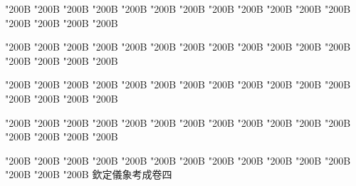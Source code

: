 \begin{正文}
\char"200B\relax{}
\char"200B\relax{}
\char"200B\relax{}
\char"200B\relax{}
\char"200B\relax{}
\char"200B\relax{}
\char"200B\relax{}
\char"200B\relax{}
\char"200B\relax{}
\char"200B\relax{}
\char"200B\relax{}
\char"200B\relax{}
\char"200B\relax{}
\char"200B\relax{}
\char"200B\relax{}
\char"200B\relax
{}\par
\end{正文}\clearpage
{}
\begin{正文}
\char"200B\relax{}
\char"200B\relax{}
\char"200B\relax{}
\char"200B\relax{}
\char"200B\relax{}
\char"200B\relax{}
\char"200B\relax{}
\char"200B\relax{}
\char"200B\relax{}
\char"200B\relax{}
\char"200B\relax{}
\char"200B\relax{}
\char"200B\relax{}
\char"200B\relax{}
\char"200B\relax{}
\char"200B\relax
{}\par
\end{正文}\clearpage
{}
\begin{正文}
\char"200B\relax{}
\char"200B\relax{}
\char"200B\relax{}
\char"200B\relax{}
\char"200B\relax{}
\char"200B\relax{}
\char"200B\relax{}
\char"200B\relax{}
\char"200B\relax{}
\char"200B\relax{}
\char"200B\relax{}
\char"200B\relax{}
\char"200B\relax{}
\char"200B\relax{}
\char"200B\relax{}
\char"200B\relax
{}\par
\end{正文}\clearpage
{}
\begin{正文}
\char"200B\relax{}
\char"200B\relax{}
\char"200B\relax{}
\char"200B\relax{}
\char"200B\relax{}
\char"200B\relax{}
\char"200B\relax{}
\char"200B\relax{}
\char"200B\relax{}
\char"200B\relax{}
\char"200B\relax{}
\char"200B\relax{}
\char"200B\relax{}
\char"200B\relax{}
\char"200B\relax{}
\char"200B\relax
{}\par
\end{正文}\clearpage
{}
\begin{正文}
\char"200B\relax{}
\char"200B\relax{}
\char"200B\relax{}
\char"200B\relax{}
\char"200B\relax{}
\char"200B\relax{}
\char"200B\relax{}
\char"200B\relax{}
\char"200B\relax{}
\char"200B\relax{}
\char"200B\relax{}
\char"200B\relax{}
\char"200B\relax{}
\char"200B\relax{}
\char"200B\relax{}
欽定儀象考成卷四
\par

\par\end{正文}\clearpage
